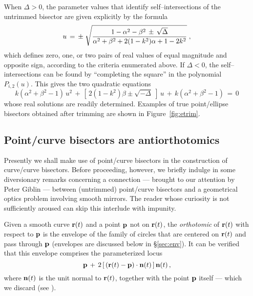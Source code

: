 When $\Delta>0$, the parameter values that identify self--intersections
of the untrimmed bisector are given explicitly by the formula
\begin{equation}
u \,=\, \pm \; \sqrt{ 1-\alpha^2-\beta^2 \,\pm\,
\sqrt{\Delta} \over \alpha^2+\beta^2+2(1-k^2)\alpha+1-2k^2} \;,
\end{equation}
which defines zero, one, or two pairs of real values of equal
magnitude and opposite sign, according to the criteria enumerated
above. If $\Delta<0$, the self--intersections can be found by
``completing the square'' in the polynomial $P_{i,2}(u)$. This
gives the two quadratic equations
\begin{equation} \label{I2new2}
k(\alpha^2+\beta^2-1)\,u^2 \,+\,
[\,2(1-k^2)\beta \pm \sqrt{-\Delta}\;]\,u \,+\,
k(\alpha^2+\beta^2-1) \,=\, 0
\end{equation}
whose real solutions are readily determined. Examples of true
point/ellipse bisectors obtained after trimming are shown in
Figure~\ref{fig:etrim}.

\subsection{Point/curve bisectors are antiorthotomics}
\label{antiorth}

Presently we shall make use of point/curve bisectors in
the construction of curve/curve bisectors. Before proceeding,
however, we briefly indulge in some diversionary remarks
concerning a connection --- brought to our attention by Peter
Giblin --- between (untrimmed) point/curve bisectors and a
geometrical optics problem involving smooth mirrors. The
reader whose curiosity is not sufficiently aroused can skip
this interlude with impunity.

Given a smooth curve ${\bf r}(t)$ and a point ${\bf p}$ not
on ${\bf r}(t)$, the {\it orthotomic\/} of ${\bf r}(t)$ with
respect to ${\bf p}$ is the envelope of the family of circles
that are centered on ${\bf r}(t)$ and pass through ${\bf p}$
(envelopes are discussed below in \S\ref{sec:env}). It can be
verified that this envelope comprises the parameterized locus
\begin{equation} \label{ortho}
{\bf p} \,+\,
2\,[\,({\bf r}(t)-{\bf p})\cdot{\bf n}(t)\,]\,{\bf n}(t) \,,
\end{equation}
where ${\bf n}(t)$ is the unit normal to ${\bf r}(t)$, together
with the point ${\bf p}$ itself --- which we discard (see \cite
{bruce84}).

